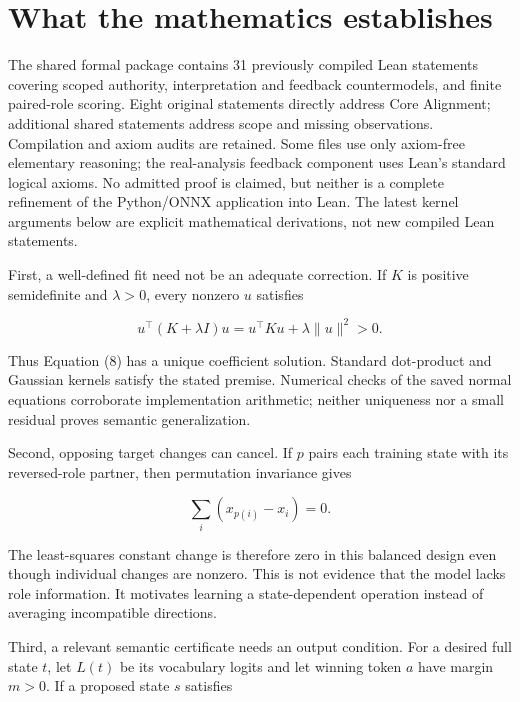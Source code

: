 \documentclass[11pt,letterpaper]{article}
\begin{document}
\section{What the mathematics establishes}

The shared formal package contains 31 previously compiled Lean statements covering scoped authority, interpretation and feedback countermodels, and finite paired-role scoring. Eight original statements directly address Core Alignment; additional shared statements address scope and missing observations. Compilation and axiom audits are retained. Some files use only axiom-free elementary reasoning; the real-analysis feedback component uses Lean's standard logical axioms. No admitted proof is claimed, but neither is a complete refinement of the Python/ONNX application into Lean. The latest kernel arguments below are explicit mathematical derivations, not new compiled Lean statements.

First, a well-defined fit need not be an adequate correction. If \(K\) is positive semidefinite and \(\lambda>0\), every nonzero \(u\) satisfies

\begin{equation}
u^\top(K+\lambda I)u=u^\top Ku+\lambda\lVert u\rVert^2>0. \tag{10}
\end{equation}

Thus Equation (8) has a unique coefficient solution. Standard dot-product and Gaussian kernels satisfy the stated premise. Numerical checks of the saved normal equations corroborate implementation arithmetic; neither uniqueness nor a small residual proves semantic generalization.

Second, opposing target changes can cancel. If \(p\) pairs each training state with its reversed-role partner, then permutation invariance gives

\begin{equation}
\sum_i(x_{p(i)}-x_i)=0. \tag{11}
\end{equation}

The least-squares constant change is therefore zero in this balanced design even though individual changes are nonzero. This is not evidence that the model lacks role information. It motivates learning a state-dependent operation instead of averaging incompatible directions.

Third, a relevant semantic certificate needs an output condition. For a desired full state \(t\), let \(L(t)\) be its vocabulary logits and let winning token \(a\) have margin \(m>0\). If a proposed state \(s\) satisfies
\end{document}
